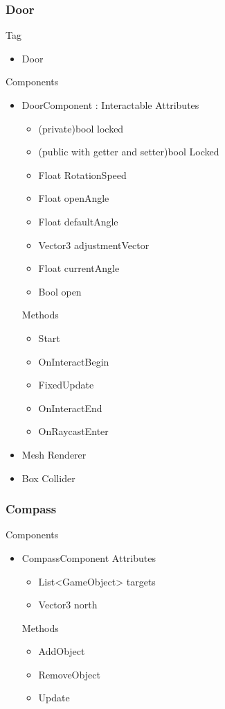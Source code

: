 \documentclass[11pt]{article}
\begin{document}
\subsubsection{Door}
Tag
\begin{itemize}
	\item Door
\end{itemize}
Components
\begin{itemize}
	\item DoorComponent : Interactable
	\newline Attributes
	\begin{itemize}
		\item (private)bool locked
		\item (public with getter and setter)bool Locked
		\item Float RotationSpeed
		\item Float openAngle
		\item Float defaultAngle
		\item Vector3 adjustmentVector
		\item Float currentAngle
		\item Bool open
	\end{itemize}
	Methods
	\begin{itemize}
		\item Start
		\item OnInteractBegin
		\item FixedUpdate
		\item OnInteractEnd
		\item OnRaycastEnter
	\end{itemize}
	\item Mesh Renderer
	\item Box Collider
\end{itemize}

\subsubsection{Compass}
Components
\begin{itemize}
	\item CompassComponent
	\newline Attributes
	\begin{itemize}
		\item List<GameObject> targets
		\item Vector3 north
	\end{itemize}
	Methods
	\begin{itemize}
		\item AddObject
		\item RemoveObject
		\item Update
	\end{itemize}
\end{itemize}
\end{document}

